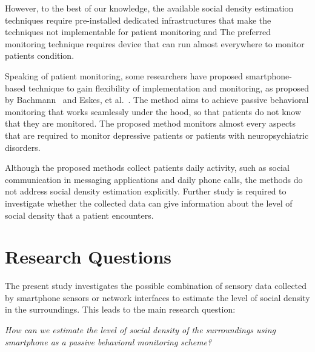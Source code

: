 However, to the best of our knowledge, the available social density estimation techniques require pre-installed dedicated infrastructures that make the techniques not implementable for patient monitoring and
The preferred monitoring technique requires device that can run almost everywhere to monitor patients condition.

Speaking of patient monitoring, some researchers have proposed smartphone-based technique to gain flexibility of implementation and monitoring, as proposed by Bachmann~\cite{thesis031} and Eskes, et al.~\cite{thesis015}. The method aims to achieve passive behavioral monitoring that works seamlessly under the hood, so that patients do not know that they are monitored. The proposed method monitors almost every aspects that are required to monitor depressive patients or patients with neuropsychiatric disorders.

Although the proposed methods collect patients daily activity, such as social communication in messaging applications and daily phone calls, the methods do not address social density estimation explicitly. Further study is required to investigate whether the collected data can give information about the level of social density that a patient encounters. 

\section{Research Questions} %
\label{sec:research_questions}
The present study investigates the possible combination of sensory data collected by smartphone sensors or network interfaces to estimate the level of social density in the surroundings. 
This leads to the main research question:
\begin{displayquote}\textit{
How can we estimate the level of social density of the surroundings using smartphone as a passive behavioral monitoring scheme?}
\end{displayquote}

